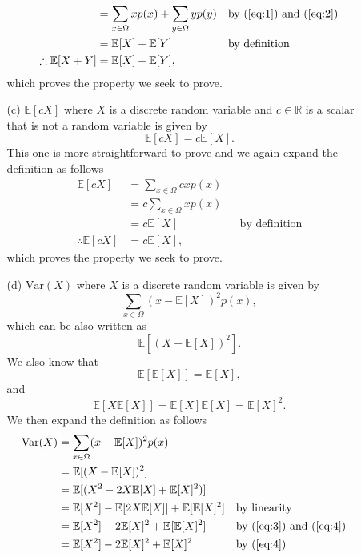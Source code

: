 \documentclass [10pt]{article}
\begin{document}
\begin{enumerate}
\begin{enumerate}
\begin{align}
			&=\sum_{x\in\Omega}xp(x)+\sum_{y\in\Omega}yp(y)&&\text{by (\ref{eq:1}) and (\ref{eq:2})}\nonumber\\
			&=\mathbb{E}[X]+\mathbb{E}[Y]&&\text{by definition}\nonumber\\
			\therefore\mathbb{E}[X+Y]&=\mathbb{E}[X]+\mathbb{E}[Y],\nonumber
		\end{align}
		which proves the property we seek to prove.
		\item[(c)]$\mathbb{E}[cX]$ where $X$ is a discrete random variable and $c\in\mathbb{R}$ is a scalar that is not a random variable is given by$$\mathbb{E}[cX]=c\mathbb{E}[X].$$This one is more straightforward to prove and we again expand the definition as follows
		\begin{align}
			\mathbb{E}[cX]&=\sum_{x\in\Omega}cxp(x)\nonumber\\
			&=c\sum_{x\in\Omega}xp(x)\nonumber\\
			&=c\mathbb{E}[X]&&\text{by definition}\nonumber\\
			\therefore\mathbb{E}[cX]&=c\mathbb{E}[X],\nonumber
		\end{align}
		which proves the property we seek to prove.
		\item[(d)]$\text{Var}(X)$ where $X$ is a discrete random variable is given by$$\sum_{x\in\Omega}(x-\mathbb{E}[X])^{2}p(x),$$which can be also written as$$\mathbb{E}[(X-\mathbb{E}[X])^{2}].$$We also know that
		\begin{equation}\label{eq:3}
			\mathbb{E}[\mathbb{E}[X]]=\mathbb{E}[X],
		\end{equation}
		and
		\begin{equation}\label{eq:4}
			\mathbb{E}[X\mathbb{E}[X]]=\mathbb{E}[X]\mathbb{E}[X]=\mathbb{E}[X]^{2}.
		\end{equation}
		We then expand the definition as follows
		\begin{align}
			\text{Var}(X)&=\sum_{x\in\Omega}(x-\mathbb{E}[X])^{2}p(x)\nonumber\\
			&=\mathbb{E}[(X-\mathbb{E}[X])^{2}]\nonumber\\
			&=\mathbb{E}[(X^{2}-2X\mathbb{E}[X]+\mathbb{E}[X]^{2})]\nonumber\\
			&=\mathbb{E}[X^{2}]-\mathbb{E}[2X\mathbb{E}[X]]+\mathbb{E}[\mathbb{E}[X]^{2}]&&\text{by linearity}\nonumber\\
			&=\mathbb{E}[X^{2}]-2\mathbb{E}[X]^{2}+\mathbb{E}[\mathbb{E}[X]^{2}]&&\text{by (\ref{eq:3}) and (\ref{eq:4})}\nonumber\\
			&=\mathbb{E}[X^{2}]-2\mathbb{E}[X]^{2}+\mathbb{E}[X]^{2}&&\text{by (\ref{eq:4})}\nonumber\\

\end{align}
\end{enumerate}
\end{enumerate}
\end{document}
